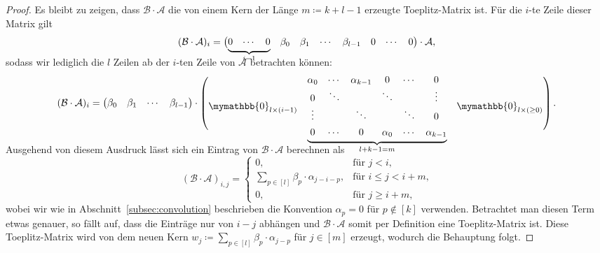 \documentclass[paper=a4, 	%
		fontsize=11pt,
		abstract=true, 	%
		headsepline, 	%
		notitlepage	%
		]{scrartcl}
\theoremstyle{definition}
\newcommand{\fNat}[1]{[ #1 ]}
\begin{document}
\begin{proof}
    Es bleibt zu zeigen, dass $\mathcal{B}\cdot \mathcal{A}$ die von einem Kern der Länge $m\coloneqq k+l-1$ erzeugte Toeplitz-Matrix ist. 
    Für die $i$-te Zeile dieser Matrix gilt
    \[
        (\mathcal{B} \cdot \mathcal{A})_i
        = \begin{pmatrix}
                \smash[b]{\underbrace{\begin{matrix}0 & \cdots & 0\end{matrix}}_{i-1}} & \beta_0 & \beta_1 & \cdots & \beta_{l-1} & 0 & \cdots & 0
            \end{pmatrix} \cdot \mathcal{A}, \\[1em]
    \]
    sodass wir lediglich die $l$ Zeilen ab der $i$-ten Zeile von $\mathcal{A}$ betrachten können:
    \[
        (\mathcal{B} \cdot \mathcal{A})_i = 
            \begin{pmatrix}
                \beta_0 & \beta_1 & \cdots & \beta_{l-1}
            \end{pmatrix} \cdot \begin{pmatrix}
                \mymathbb{0}_{l\times (i-1)} & \smash[b]{\underbrace{\begin{matrix}
                    \alpha_0 & \cdots & \alpha_{k-1} & 0 & \cdots & 0 \\
                    0 & \ddots & & \ddots  & & \vdots \\
                    \vdots  & & \ddots & & \ddots & 0 \\[4pt]
                    0 & \cdots & 0 & \alpha_0 & \cdots & \alpha_{k-1} \\
            \end{matrix}}_{l + k - 1 = m}} & \mymathbb{0}_{l\times (\geq 0)}\\[2em]
        \end{pmatrix}. \\[2em]
    \]

    Ausgehend von diesem Ausdruck lässt sich ein Eintrag von $\mathcal{B}\cdot \mathcal{A}$ berechnen als
    \[
        (\mathcal{B}\cdot \mathcal{A})_{i,j} = \begin{cases}
            0, & \text{für $j < i$,}\\
            \sum_{p\in \fNat{l}} \beta_{p} \cdot \alpha_{j - i - p}, & \text{für $i \leq j < i+m$,}\\
            0, & \text{für $j \geq i+m$,}
        \end{cases}
    \]
    wobei wir wie in Abschnitt~\ref{subsec:convolution} beschrieben die Konvention $\alpha_p = 0$ für $p\notin \fNat{k}$ verwenden.
    Betrachtet man diesen Term etwas genauer, so fällt auf, dass die Einträge nur von $i-j$ abhängen und $\mathcal{B}\cdot \mathcal{A}$ somit per Definition eine Toeplitz-Matrix ist.
    Diese Toeplitz-Matrix wird von dem neuen Kern $w_j \coloneqq \sum_{p\in\fNat{l}} \beta_p \cdot \alpha_{j - p}$ für $j\in\fNat{m}$ erzeugt, wodurch die Behauptung folgt.
\end{proof}
\end{document}
